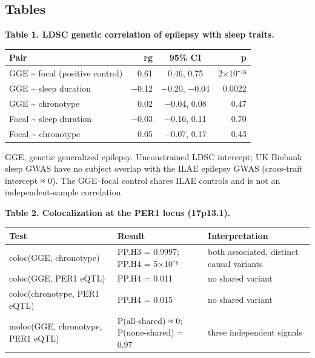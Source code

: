 \documentclass[
]{article}
\newcounter{none} %
\begin{document}
\newpage

\subsection{Tables}\label{tables}

\textbf{Table 1. LDSC genetic correlation of epilepsy with sleep
traits.}

{\def\LTcaptype{none} %
\begin{longtable}[]{@{}lrcr@{}}
\toprule\noalign{}
Pair & rg & 95\% CI & p \\
\midrule\noalign{}
\endhead
\bottomrule\noalign{}
\endlastfoot
GGE \textasciitilde{} focal (positive control) & 0.61 & 0.46, 0.75 &
2×10⁻¹⁶ \\
GGE \textasciitilde{} sleep duration & −0.12 & −0.20, −0.04 & 0.0022 \\
GGE \textasciitilde{} chronotype & 0.02 & −0.04, 0.08 & 0.47 \\
Focal \textasciitilde{} sleep duration & −0.03 & −0.16, 0.11 & 0.70 \\
Focal \textasciitilde{} chronotype & 0.05 & −0.07, 0.17 & 0.43 \\
\end{longtable}
}

GGE, genetic generalized epilepsy. Unconstrained LDSC intercept; UK
Biobank sleep GWAS have no subject overlap with the ILAE epilepsy GWAS
(cross-trait intercept ≈ 0). The GGE--focal control shares ILAE controls
and is not an independent-sample correlation.

\textbf{Table 2. Colocalization at the PER1 locus (17p13.1).}

{\def\LTcaptype{none} %
\begin{longtable}[]{@{}
  >{\raggedright\arraybackslash}p{}
  >{\raggedright\arraybackslash}p{}
  >{\raggedright\arraybackslash}p{}@{}}
\toprule\noalign{}
\begin{minipage}[b]{\linewidth}\raggedright
Test
\end{minipage} & \begin{minipage}[b]{\linewidth}\raggedright
Result
\end{minipage} & \begin{minipage}[b]{\linewidth}\raggedright
Interpretation
\end{minipage} \\
\midrule\noalign{}
\endhead
\bottomrule\noalign{}
\endlastfoot
coloc(GGE, chronotype) & PP.H3 = 0.9997; PP.H4 = 5×10⁻⁶ & both
associated, distinct causal variants \\
coloc(GGE, PER1 eQTL) & PP.H4 = 0.011 & no shared variant \\
coloc(chronotype, PER1 eQTL) & PP.H4 = 0.015 & no shared variant \\
moloc(GGE, chronotype, PER1 eQTL) & P(all-shared) ≈ 0; P(none-shared) =
0.97 & three independent signals \\
\end{longtable}
}
\end{document}
